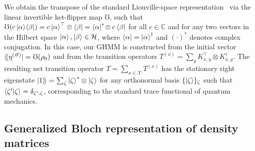\documentclass[prx,nofootinbib,onecolumn,showkeys,groupaddress,preprintnumbers,floatfix,
superscriptaddress]{revtex4-1}
\newcommand{\Abet}{\mathcal{X}}
\newcommand{\dbra}[1]{\bra{ \! \langle #1}}
\newcommand{\dket}[1]{\ket{ #1 \rangle \!}}
\newcommand{\init}{\dbra{\eta^{(\varnothing)}}}
\begin{document}
We obtain the transpose of the standard Liouville-space representation~\cite{Gyamfi2020fundamentals} 
via the linear invertible ket-flipper map $\mho$,
such that $\mho(c \ket{\alpha} \! \bra{\beta}) = c \ket{\alpha}^\top \otimes \bra{\beta} = \bra{\alpha}^* \! \otimes c \bra{\beta} $ 
for all $c \in \mathbb{C}$ and for any two vectors in the Hilbert space $\ket{\alpha}, \ket{\beta} \in \mathcal{H}$, where $\bra{\alpha} = \ket{\alpha}^\dagger$ and $(\cdot)^*$ denotes complex conjugation.
In this case, our GHMM is constructed from the initial vector $\init = \mho(\rho_0)$
and from the transition operators
$T^{(x)} = \sum_y K_{x,y}^\top \otimes K_{x,y}^\dagger$.
The resulting net transition operator 
$T = \sum_{x \in \Abet} T^{(x)}$
has the stationary right 
eigenstate $\dket{1} = \sum_{\zeta} \ket{\zeta}^* \otimes \ket{\zeta}$
for any orthonormal basis $\{ \ket{\zeta}\}_\zeta$ such that $\braket{\zeta'| \zeta} = \delta_{\zeta', \zeta}$, corresponding to the standard trace functional of quantum mechanics.


\subsection{Generalized Bloch representation of density matrices}
\end{document}
